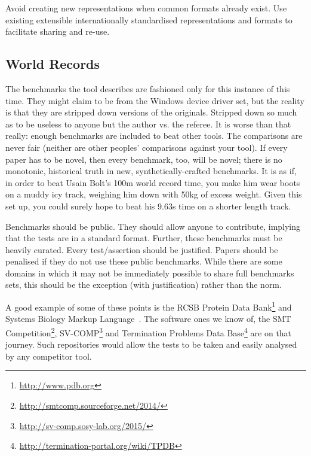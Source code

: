 \documentclass[a4paper,11pt]{article}
\begin{document}
 Avoid creating
new representations when common formats already exist. Use existing
extensible internationally standardised representations and formats to
facilitate sharing and re-use.

\subsection{World Records}

The benchmarks the tool describes are fashioned only for this instance
of this time. They might claim to be from the Windows device driver
set, but the reality is that they are stripped down versions of the
originals. Stripped down so much as to be useless to anyone but the
author vs. the referee. It is worse than that really: enough
benchmarks are included to beat other tools. The comparisons are never
fair (neither are other peoples' comparisons against your tool). If
every paper has to be novel, then every benchmark, too, will be novel;
there is no monotonic, historical truth in new, synthetically-crafted
benchmarks. It is as if, in order to beat Usain Bolt's
\num{100}\si{\metre} world record time, you make him wear boots on a
muddy icy track, weighing him down with \num{50}\si{\kilogram} of
excess weight. Given this set up, you could surely hope to beat his
\num{9.63}\si{\second} time on a shorter length track.

 Benchmarks should
be public. They should allow anyone to contribute, implying that the
tests are in a standard format. Further, these benchmarks must be
heavily curated. Every test/assertion should be justified. Papers
should be penalised if they do not use these public benchmarks. While
there are some domains in which it may not be immediately possible to
share full benchmarks sets, this should be the exception (with
justification) rather than the norm.

A good example of some of these points is the RCSB Protein Data
Bank\footnote{\url{http://www.pdb.org}} and Systems Biology Markup
Language~\cite{Chaouiya2013}. The software ones we know of,
the SMT
Competition\footnote{\url{http://smtcomp.sourceforge.net/2014/}},
SV-COMP\footnote{\url{http://sv-comp.sosy-lab.org/2015/}} and
Termination Problems Data
Base\footnote{\url{http://termination-portal.org/wiki/TPDB}} are on
that journey. Such repositories would allow the tests to be taken and
easily analysed by any competitor tool.
\end{document}
